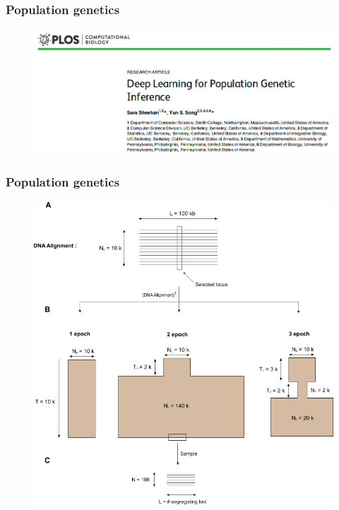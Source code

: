 \begin{frame}
        \frametitle{Population genetics}

        \begin{figure}
        	\includegraphics[width=1\textwidth]{Pics/sara.png}
        \end{figure}

\end{frame}

\begin{frame}
	\frametitle{Population genetics}
	
	\begin{figure}
		\centering
		\includegraphics[height=0.8\textheight]{Pics/simulations.png}
	\end{figure}

\end{frame}

